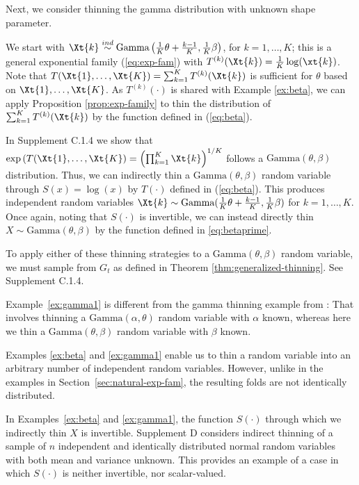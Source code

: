 \documentclass[12pt]{article}
\begin{document}
Next, we consider thinning the gamma distribution with unknown shape parameter.

\begin{exmp} \label{ex:gamma1} 
We start with $\Xt{k} \overset{ind}{\sim} \text{Gamma}\left(\frac{1}{K}\theta + \frac{k-1}{K}, \frac{1}{K}\beta\right)$,  for  $k=1,\dots,K$; this is a general exponential family (\ref{eq:exp-fam}) with $T^{(k)}(\Xt{k})=\frac{1}{K}\log(\xt{k})$. Note that
$T(\Xt{1},\dots,\Xt{K})=\sum_{k=1}^K T^{(k)}(\Xt{k})$ is sufficient for $\theta$ based on $\Xt{1},\ldots,\Xt{K}$. As $T^{(k)}(\cdot)$ is shared with Example \ref{ex:beta}, we can apply Proposition \ref{prop:exp-family} to thin the distribution of $\sum_{k=1}^K T^{(k)}(\Xt{k})$ by the function defined in (\ref{eq:beta}).

In Supplement C.1.4 we show that $\exp\left(T(\Xt{1},\dots,\Xt{K}\right)=\left(\prod_{k=1}^K\Xt{k}\right)^{1/K}$
follows a $\text{Gamma}(\theta, \beta)$ distribution. Thus, we can indirectly thin a $\text{Gamma}(\theta,\beta)$ random variable through $S(x)=\log(x)$ by $T(\cdot)$ defined in (\ref{eq:beta}). This produces independent random variables $\Xt{k}\sim\text{Gamma}(\frac{1}{K}\theta+\frac{k-1}{K},\frac{1}{K}\beta)$ for $k=1,\dots,K$. Once again, noting that $S(\cdot)$ is invertible, we can instead directly thin $X\sim\text{Gamma}(\theta,\beta)$ by the function defined in \eqref{eq:betaprime}.

To apply either of these thinning strategies to a $\text{Gamma}(\theta,\beta)$ random variable, we must sample from $G_t$ as defined in Theorem \ref{thm:generalized-thinning}. 
See Supplement C.1.4. 
\end{exmp}

 Example~\ref{ex:gamma1} is different from the gamma thinning example from \cite{neufeld2023data}: That involves thinning a $\text{Gamma}(\alpha,\theta)$ random variable with $\alpha$ known, whereas here we thin a $\text{Gamma}(\theta,\beta)$ random variable with $\beta$ known. 

Examples \ref{ex:beta} and \ref{ex:gamma1} enable us to thin a random variable into an arbitrary number of independent random variables. However, unlike in the examples in Section~\ref{sec:natural-exp-fam}, the  resulting folds are not identically distributed.

In Examples~\ref{ex:beta} and \ref{ex:gamma1}, the function  $S(\cdot)$ through which we indirectly thin $X$ is invertible. Supplement D considers indirect thinning of a sample of $n$ independent and identically distributed normal random variables with both mean and variance unknown. This provides an example of a case
in which $S(\cdot)$ is neither invertible, nor scalar-valued.
\end{document}
